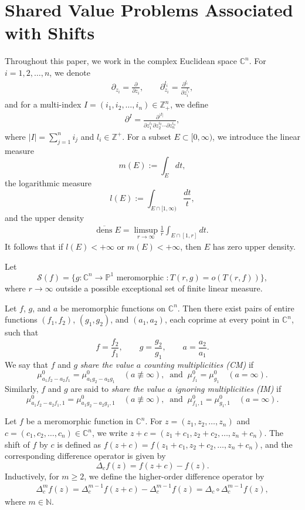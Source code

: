 \documentclass[11pt,reqno]{amsart}
\numberwithin{equation}{section}
\begin{document}
\section{{\bf Shared Value Problems Associated with Shifts}}

Throughout this paper, we work in the complex Euclidean space $\mathbb{C}^n$.  
For $i=1,2,\ldots,n$, we denote
\begin{align*}
	\partial_{z_i}=\frac{\partial}{\partial z_i}, \qquad 
	\partial_{z_i}^{l_i}=\frac{\partial^{l_i}}{\partial z_i^{l_i}},
\end{align*}
and for a multi-index $I=(i_1,i_2,\ldots,i_n)\in \mathbb{Z}_+^n$, we define
\begin{align*}
	\partial^{I}
	=\frac{\partial^{|I|}}{\partial z_1^{i_1}\partial z_2^{i_2}\cdots \partial z_n^{i_n}},
\end{align*}
where $|I|=\sum_{j=1}^{n} i_j$ and $l_i\in \mathbb{Z}^+$.
For a subset $E\subset [0,\infty)$, we introduce the linear measure
\[
m(E):=\int_E dt,
\]
the logarithmic measure
\[
l(E):=\int_{E\cap [1,\infty)} \frac{dt}{t},
\]
and the upper density
\begin{align*}
	\overline{\mathrm{dens}}\;E
	=\limsup_{r\to\infty}\frac{1}{r}\int_{E\cap [1,r]} dt.
\end{align*}
It follows that if $l(E)<+\infty$ or $m(E)<+\infty$, then $E$ has zero upper density.

Let
\[
\mathcal{S}(f)
=\bigl\{ g:\mathbb{C}^n\to\mathbb{P}^1 \text{ meromorphic } :
T(r,g)=o\!\left(T(r,f)\right) \bigr\},
\]
where $r\to\infty$ outside a possible exceptional set of finite linear measure.

\smallskip
Let $f$, $g$, and $a$ be meromorphic functions on $\mathbb{C}^n$. Then there exist pairs of entire functions $(f_1,f_2)$, $(g_1,g_2)$, and $(a_1,a_2)$, each coprime at every point in $\mathbb{C}^n$, such that
\[
f=\frac{f_2}{f_1}, \qquad
g=\frac{g_2}{g_1}, \qquad
a=\frac{a_2}{a_1}.
\]
We say that $f$ and $g$ \emph{share the value $a$ counting multiplicities (CM)} if
\[
\mu^0_{a_1f_2-a_2f_1}
=\mu^0_{a_1g_2-a_2g_1}
\quad (a\not\equiv\infty),\;\;\text{and}\;\;
\mu^0_{f_1}=\mu^0_{g_1}
\quad (a=\infty).
\]
Similarly, $f$ and $g$ are said to \emph{share the value $a$ ignoring multiplicities (IM)} if
\[
\mu^0_{a_1f_2-a_2f_1,1}
=\mu^0_{a_1g_2-a_2g_1,1}
\quad (a\not\equiv\infty),\;\;\text{and}\;\;
\mu^0_{f_1,1}=\mu^0_{g_1,1}
\quad (a=\infty).
\]

\vspace{1.2mm}

Let $f$ be a meromorphic function in $\mathbb{C}^n$. For $z=(z_1,z_2,\ldots,z_n)$ and
$c=(c_1,c_2,\ldots,c_n)\in\mathbb{C}^n$, we write $z+c=(z_1+c_1,z_2+c_2,\ldots,z_n+c_n).$
The shift of $f$ by $c$ is defined as $f(z+c)=f(z_1+c_1,z_2+c_2,\ldots,z_n+c_n)$,
and the corresponding difference operator is given by
\[
\Delta_c f(z)=f(z+c)-f(z).
\]
Inductively, for $m\ge2$, we define the higher-order difference operator by
\begin{align*}
	\Delta_c^m f(z)=\Delta_c^{m-1}f(z+c)-\Delta_c^{m-1}f(z)=\Delta_c\circ\Delta_c^{m-1}f(z),
\end{align*}
where $m\in\mathbb{N}$.
\end{document}
